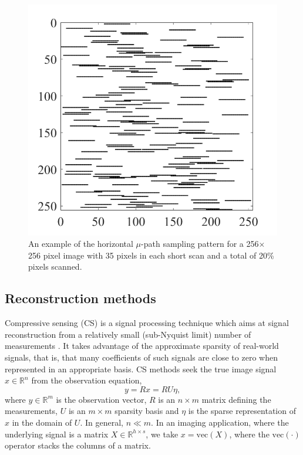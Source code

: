 \documentclass[twocolumn,oneside]{IEEEtran/IEEEtran}
\begin{document}
\begin{figure}
  \centering
  \includegraphics[width=0.7\columnwidth]{figures-SBA/random_mask.pdf}
  \caption{An example of the horizontal $\mu$-path sampling pattern for a 256$\times$256 pixel image with 35 pixels in each short scan and a total of 20\% pixels scanned.}
  \label{fig:mu_mask}
\end{figure}
\subsection{Reconstruction methods}
\label{sec:reconstructionMethods}
Compressive sensing (CS) is a signal processing technique which aims at signal reconstruction from a
relatively small (sub-Nyquist limit) number of measurements
\cite{carmi2014compressive}. It takes advantage of the approximate sparsity of
real-world signals, that is, that many coefficients of such signals
are close to zero when represented in an appropriate basis. CS methods seek the
true image signal $x\in\mathbb{R}^n$ from the observation equation,
\begin{equation}\label{op:observation}
  y = R x = RU\eta,
\end{equation}
\noindent where $y\in\mathbb{R}^m$ is the observation vector, $R$ is an
$n\times m$ matrix defining the measurements, $U$ is an $m\times m$ sparsity
basis and $\eta$ is the sparse representation of $x$ in the domain of $U$. In
general, $n\ll m$. In an imaging application, where the underlying signal is a
matrix $X\in\mathbb{R}^{h\times s}$, we take $x=\text{vec}(X)$, where the
$\text{vec}(\cdot)$ operator stacks the columns of a matrix.
\end{document}
